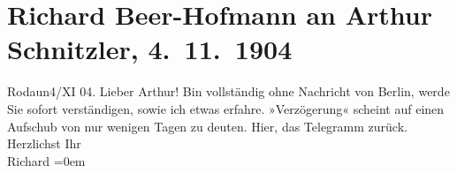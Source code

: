 

         
         \renewcommand{\erwaehntePersonen}{Personen: Richard Beer-Hofmann}
         \renewcommand{\erwaehnteOrte}{Orte: Berlin, Rodaun, Wien}
         \renewcommand{\erwaehnteWerke}{}
               \section[Richard Beer-Hofmann an Arthur Schnitzler, 4. 11. 1904]{ Richard Beer-Hofmann an Arthur Schnitzler, 4. 11. 1904}\nopagebreak{}\rehead{ }\begin{ledgroupsized}[t]{13cm}\normalsize\beginnumbering \toendnotes[C]{\smallbreak\pagebreak[2]} 
\pstart
           \raggedleft{}{\pb}Rodaun4/XI 04.\pend
           \pstart
           Lieber Arthur! Bin vollständig ohne Nachricht von Berlin, werde Sie sofort verständigen, sowie ich etwas erfahre.
               »Verzögerung« scheint auf einen Aufschub von nur wenigen Tagen zu deuten. Hier, das
               Telegramm zurück.\pend
           \pstart
           Herzlichst Ihr{\\[\baselineskip]}\spacefill\mbox{Richard}\pend
           \leftskip=0em{}
         
         \endnumbering{}\end{ledgroupsized}  \newcommand{\dateiname}{L01466}\newcommand{\titel}{Richard Beer-Hofmann an Arthur Schnitzler, 4. 11. 1904}\newcommand{\editorInnen}{Martin Anton Müller und Gerd-Hermann Susen}
      